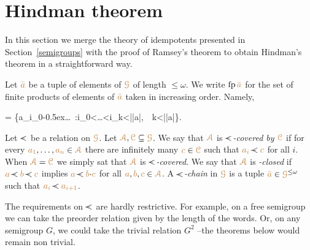 \documentclass[creche.tex]{subfiles}
\begin{document}
\section{Hindman theorem}\label{Hindman}


In this section we merge the theory of idempotents presented in Section~\ref{semigroups}
with the proof of Ramsey's theorem to obtain Hindman's theorem in a straightforward way.

Let ${\color{brown}\bar a}$ be a tuple of elements of ${\color{brown}\EuScript G}$ of length $\le\omega$.
We write ${\rm fp}\,{\color{brown}\bar a}$ for the set of finite products of elements 
of ${\color{brown}\bar a}$ taken in increasing order. 
Namely, 

{=}
{\Big\{{\mr a_{i_0}}\kern-0.5ex\cdot\dots{}\ :\quad i_0<\dots<i_k<|{\mr\bar a}|,\ \ k<|{\mr\bar a}|\Big\}}. 


% 
% 
\bigskip
Let \emph{$\cpaw$\/} be a relation on ${\color{brown}\EuScript G}$.
Let ${\color{brown}{\EuScript A}},{\color{brown}\EuScript C}\subseteq{\color{brown}\EuScript G}$.
We say that ${\color{brown}{\EuScript A}}$ is \emph{$\cpaw$-covered by ${\color{brown}\EuScript C}$\/} 
if for every ${\color{brown} a_1},\dots,{\color{brown} a_n}\in{\color{brown}{\EuScript A}}$ there are infinitely many ${\color{brown} c}\in{\color{brown}\EuScript C}$ such that ${\mr a_i}\cpaw{\mr c}$ for all $i$.
When ${\color{brown}{\EuScript A}}={\color{brown}\EuScript C}$ we simply sat that ${\color{brown}{\EuScript A}}$ is \emph{$\cpaw$-covered}.
We say that ${\color{brown}{\EuScript A}}$ is \emph{\cpawdot-closed\/} 
if ${\mr a}\cpaw{\mr b}\cpaw{\mr c}$ implies ${\mr a}\cpaw{\mr b}{\cdot}{\mr c}$ 
for all ${\color{brown} a},{\color{brown} b},{\color{brown} c}\in{\color{brown}{\EuScript A}}$.
A \emph{$\cpaw$-chain\/} in ${\color{brown}\EuScript G}$ is a tuple ${\color{brown}\bar a}\in{\color{brown}\EuScript G}^{\le\omega}$ such that ${\mr a_i}\cpaw{\mr a_{i+1}}$.

The requirements on  $\cpaw$ are hardly restrictive.
For example, on a free semigroup we can take the preorder relation given by the length of the words.
Or, on any semigroup $G$, we could take the trivial relation $G^2$ --the theorems below would remain non trivial. %
\end{document}
